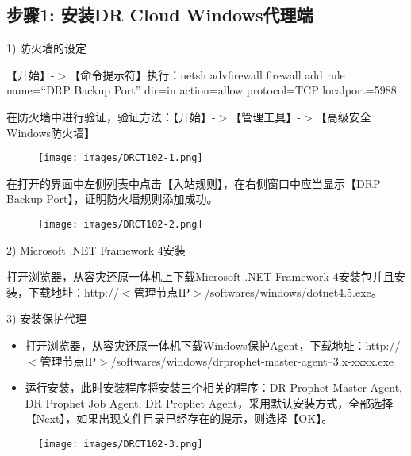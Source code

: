 \subsection{步骤1: 安装DR Cloud Windows代理端}
\label{步骤1:安装drcloudwindows代理端}

1) 防火墙的设定

【开始】-$>$【命令提示符】执行：netsh advfirewall firewall add rule name=``DRP Backup Port'' dir=in action=allow protocol=TCP localport=5988

在防火墙中进行验证，验证方法：【开始】-$>$【管理工具】-$>$【高级安全Windows防火墙】

\begin{figure}[htbp]
\centering
\texttt{[image: images/DRCT102-1.png]}
\end{figure}

在打开的界面中左侧列表中点击【入站规则】，在右侧窗口中应当显示【DRP Backup Port】，证明防火墙规则添加成功。

\begin{figure}[htbp]
\centering
\texttt{[image: images/DRCT102-2.png]}
\end{figure}

2) Microsoft .NET Framework 4安装

打开浏览器，从容灾还原一体机上下载Microsoft .NET Framework 4安装包并且安装，下载地址：http:\slash \slash $<$管理节点IP$>$\slash softwares\slash windows\slash dotnet4.5.exe。

3) 安装保护代理

\begin{itemize}
\item 打开浏览器，从容灾还原一体机下载Windows保护Agent，下载地址：http:\slash \slash $<$管理节点IP$>$\slash softwares\slash windows\slash drprophet-master-agent--3.x-xxxx.exe

\item 运行安装，此时安装程序将安装三个相关的程序：DR Prophet Master Agent, DR Prophet Job Agent, DR Prophet Agent，采用默认安装方式，全部选择【Next】，如果出现文件目录已经存在的提示，则选择【OK】。

\end{itemize}

\begin{figure}[htbp]
\centering
\texttt{[image: images/DRCT102-3.png]}
\end{figure}

